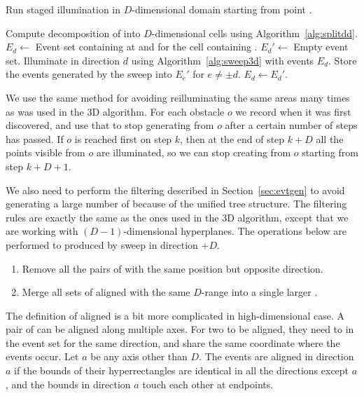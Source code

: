 \documentclass[english,gradu]{tktltiki2018}
\begin{document}
\begin{alg}\label{alg:minlinkdd}
Run staged illumination in $D$-dimensional domain \fspace starting from point \spt.
\begin{algorithmic}
\State Compute decomposition of \fspace into $D$-dimensional cells using Algorithm~\ref{alg:splitdd}.
	\State $E_d\gets$ Event set containing \addE at \spt and \cellE for the cell containing \spt.
\EndFor
{}
		\State $E_d'\gets$ Empty event set.
	\EndFor
		\State Illuminate in direction $d$ using Algorithm~\ref{alg:sweep3d} with events $E_d$.
		\State Store the events generated by the sweep into $E_e'$ for $e\neq\pm d$.
	\EndFor
		\State $E_d\gets E_d'$.
	\EndFor
\EndWhile
\end{algorithmic}
\end{alg}

We use the same method for avoiding reilluminating the same areas many times as was used in the 3D algorithm.
For each obstacle $o$ we record when it was first discovered, and use that to stop generating \addEs from $o$ after a certain number of steps has passed.
If $o$ is reached first on step $k$, then at the end of step $k+D$ all the points visible from $o$ are illuminated, so we can stop creating \addEs from $o$ starting from step $k+D+1$.

We also need to perform the filtering described in Section~\ref{sec:evtgen} to avoid generating a large number of \addEs because of the unified tree structure.
The filtering rules are exactly the same as the ones used in the 3D algorithm, except that we are working with $(D-1)$-dimensional hyperplanes.
The operations below are performed to \addEs produced by sweep in direction $+D$.
\begin{enumerate}
\item Remove all the pairs of \addEs with the same position but opposite direction.
\item Merge all sets of aligned \addEs with the same $D$-range into a single larger \addE.
\end{enumerate}

The definition of aligned \addEs is a bit more complicated in high-dimensional case.
A pair of \addEs can be aligned along multiple axes.
For two \addEs to be aligned, they need to in the event set for the same direction, and share the same coordinate where the events occur.
Let $a$ be any axis other than $D$.
The events are aligned in direction $a$ if the bounds of their hyperrectangles are identical in all the directions except $a$, and the bounds in direction $a$ touch each other at endpoints.
\end{document}
